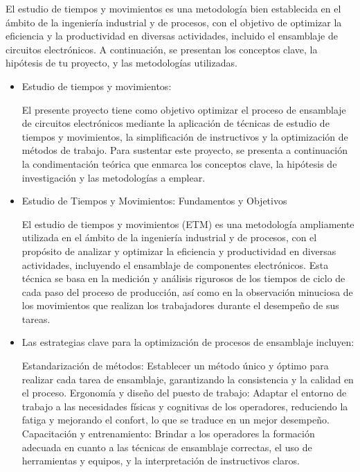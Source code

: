     El estudio de tiempos y movimientos es una metodología bien establecida en el ámbito de la ingeniería industrial y de procesos, con el objetivo de optimizar la eficiencia y la productividad en diversas actividades, incluido el ensamblaje de circuitos electrónicos. A continuación, se presentan los conceptos clave, la hipótesis de tu proyecto, y las metodologías utilizadas.
    \begin{itemize}
        \item Estudio de tiempos y movimientos:
    
    El presente proyecto tiene como objetivo optimizar el proceso de ensamblaje de circuitos electrónicos mediante la aplicación de técnicas de estudio de tiempos y movimientos, la simplificación de instructivos y la optimización de métodos de trabajo. Para sustentar este proyecto, se presenta a continuación la condimentación teórica que enmarca los conceptos clave, la hipótesis de investigación y las metodologías a emplear.
    \cite{optimizacion}
        \item Estudio de Tiempos y Movimientos: Fundamentos y Objetivos
    
    El estudio de tiempos y movimientos (ETM) es una metodología ampliamente utilizada en el ámbito de la ingeniería industrial y de procesos, con el propósito de analizar y optimizar la eficiencia y productividad en diversas actividades, incluyendo el ensamblaje de componentes electrónicos. Esta técnica se basa en la medición y análisis rigurosos de los tiempos de ciclo de cada paso del proceso de producción, así como en la observación minuciosa de los movimientos que realizan los trabajadores durante el desempeño de sus tareas.
    
        \item Las estrategias clave para la optimización de procesos de ensamblaje incluyen:
    
    Estandarización de métodos: Establecer un método único y óptimo para realizar cada tarea de ensamblaje, garantizando la consistencia y la calidad en el proceso.
    Ergonomía y diseño del puesto de trabajo: Adaptar el entorno de trabajo a las necesidades físicas y cognitivas de los operadores, reduciendo la fatiga y mejorando el confort, lo que se traduce en un mejor desempeño.
    Capacitación y entrenamiento: Brindar a los operadores la formación adecuada en cuanto a las técnicas de ensamblaje correctas, el uso de herramientas y equipos, y la interpretación de instructivos claros.
    \cite{santiago_2024}
    

\end{itemize}
